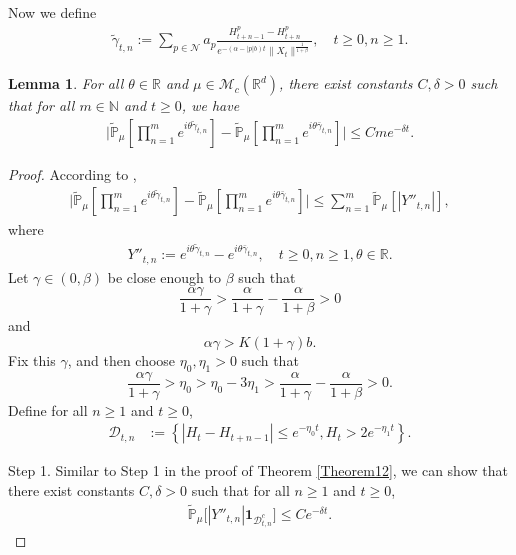 \documentclass[12pt,a4paper]{amsart}
\theoremstyle{plain}
\newtheorem{lem}[thm]{Lemma}
\theoremstyle{definition}
\numberwithin{equation}{section}
\begin{document}
Now we define
\begin{align}
    \tilde{\gamma}_{t,n}:=\sum_{p\in \mathcal{N}}a_p\frac{H^p_{t+n-1}-H^p_{t+n}}{e^{-(\alpha-|p|b)t}\|X_{t}\|^{\frac{1}{1+\beta}}},\quad t\geq 0, n\geq 1.
\end{align}
\begin{lem}\label{lem: lemma04}
     For all $\theta\in \mathbb{R}$ and $\mu\in \mathcal{M}_c(\mathbb{R}^d)$, there exist constants $C,\delta>0$
such that for all $m\in \mathbb{N}$ and $t\geq 0$, we have
\begin{align}
    \Big|\tilde{\mathbb{P}}_{\mu}[\prod_{n=1}^me^{i\theta \tilde{\gamma}_{t,n}}]-\tilde{\mathbb{P}}_{\mu}[\prod_{n=1}^me^{i\theta \bar{\gamma}_{t,n}}]\Big|\leq C m e^{-\delta t}.
\end{align}
\end{lem}
\begin{proof}
According to \cite[Lemma 3.4.3]{Durrett2010Probability},
\begin{align}\label{ineq: used next 3}
    \Big|\tilde{\mathbb{P}}_{\mu}[\prod_{n=1}^me^{i\theta \tilde{\gamma}_{t,n}}]-\tilde{\mathbb{P}}_{\mu}[\prod_{n=1}^me^{i\theta \bar{\gamma}_{t,n}}]\Big|\leq \sum_{n=1}^m\tilde{\mathbb{P}}_{\mu}[|Y''_{t,n}|],
\end{align}
where
\begin{align}
    Y''_{t,n}:=e^{i\theta\tilde{\gamma}_{t,n}}-e^{i\theta\bar{\gamma}_{t,n}},\quad t\geq 0, n\geq 1, \theta\in \mathbb{R}.
\end{align}
    Let $\gamma \in (0,\beta)$ be close enough to $\beta$ such that
\[
    \frac{\alpha \gamma}{1+\gamma} > \frac{\alpha}{1+\gamma} - \frac{\alpha}{1+\beta} > 0
\]
and
\[
   \alpha\gamma>K(1+\gamma)b.
  \]
  Fix this $\gamma$, and then choose $\eta_0,\eta_1>0$ such that
\[
    \frac{\alpha \gamma}{1+\gamma} >\eta_0 > \eta_0 - 3\eta_1 > \frac{\alpha}{1+\gamma} - \frac{\alpha}{1+\beta} > 0.
\]
    Define for all $n \geq 1$ and $t\geq 0$,
\begin{align}
\label{def: Dtk1}
    \mathcal{D}_{t,n}&:=\left\{|H_t-H_{t+n-1}|\leq  e^{-\eta_0 t}, H_{t}> 2e^{-\eta_1t}\right\}.
\end{align}

Step 1. Similar to Step 1 in the proof of Theorem \ref{Theorem12},
we can show that there exist constants $C,\delta >0$ such that for all $n \geq 1$ and $t\geq 0$,
\begin{align}
\label{thm12111}
    \mathbb{\tilde{P}}_{\mu}\big[|Y''_{t,n}|\mathbf{1}_{\mathcal{D}^c_{t,n}}\big]
    \leq C e^{-\delta t}.
\end{align}
\begin{comment}


\end{comment}
\end{proof}
\end{document}
